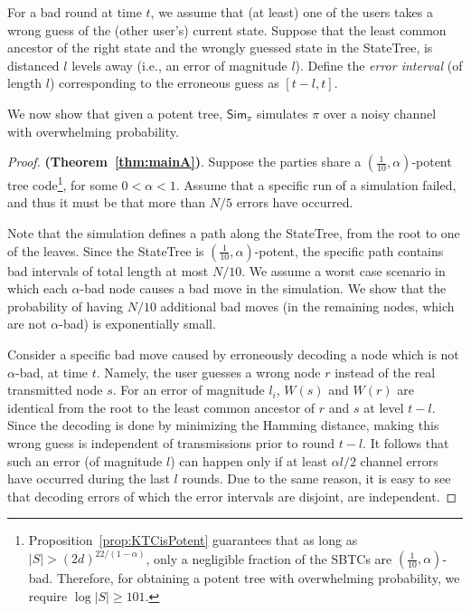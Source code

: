 \documentclass[ letterpaper, 11pt]{article}
\newcommand{\statetree}{{\textsf{StateTree}}\xspace}
\newcommand{\potent}{potent\xspace}
\newcommand{\Sim}{{\mathsf{Sim}_\pi}}
\newcommand{\KTC}{\textsf{SBTC}\xspace}
\begin{document}
For a bad round at time $t$, we assume that (at least) one of the users takes a wrong
guess of the (other user's) current state.
Suppose that
the least common ancestor of the right state and
the wrongly guessed state in the \statetree, is distanced $l$ levels away (i.e., an error of magnitude $l$).
Define the {\em error interval} (of length $l$) corresponding to the erroneous guess
as  $[t-l, t]$.


We now show that given a \potent tree,
$\Sim$  simulates $\pi$ over a noisy channel with overwhelming probability.


\begin{proof} \textbf{(Theorem~\ref{thm:mainA})}.
Suppose the parties share a $(\frac{1}{10},\alpha)$-\potent tree code\footnote{
    Proposition~\ref{prop:KTCisPotent} guarantees  that
    as long as $|S|>(2d)^{22/(1-\alpha)}$,
    only a negligible fraction of the \KTC{}s are $(\frac{1}{10},\alpha)$-bad. Therefore,
     for obtaining a \potent tree with overwhelming probability, we require $\log |S|\ge101$.},
for some $0<\alpha<1$.
Assume that a specific run of a simulation failed, and thus
it must be that more than $N/5$ errors have occurred.

Note that the simulation defines a path along the \statetree, from the root
to one of the leaves. Since the \statetree is $(\frac{1}{10},\alpha)$-\potent, the
specific path contains bad intervals of total length
at most $N/10$. We assume a worst case scenario in which
each $\alpha$-bad node causes a bad move in the simulation.
We show that
the probability of having $N/10$ additional  bad moves
(in the remaining nodes, which are not $\alpha$-bad)
is exponentially small.

Consider a specific bad move caused by erroneously decoding a node which is not $\alpha$-bad,
at time $t$. Namely, the user guesses a wrong node $r$ instead of the real transmitted node $s$.
For an error of magnitude $l_i$, $W(s)$ and $W(r)$ are identical from the root
to the least common ancestor of $r$ and $s$ at level $t-l$.
Since the decoding is done by minimizing the Hamming distance,
making this wrong guess is independent of transmissions prior to round $t-l$.
It follows that such an error (of magnitude $l$) can happen only if at least $\alpha l/2$
channel errors have occurred during the last $l$ rounds.
Due to the same reason, it is easy to see that decoding errors of which the
error intervals are disjoint, are independent.


\end{proof}
\end{document}
